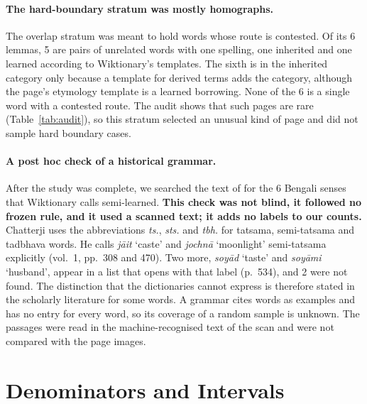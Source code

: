 \documentclass[11pt]{article}
\newcommand{\gl}[1]{`#1'}
\begin{document}
\paragraph{The hard-boundary stratum was mostly homographs.} The overlap stratum was meant to hold words whose route is contested. Of its 6 lemmas, 5 are pairs of unrelated words with one spelling, one inherited and one learned according to Wiktionary's templates. The sixth is in the inherited category only because a template for derived terms adds the category, although the page's etymology template is a learned borrowing. None of the 6 is a single word with a contested route. The audit shows that such pages are rare (Table~\ref{tab:audit}), so this stratum selected an unusual kind of page and did not sample hard boundary cases.

\paragraph{A post hoc check of a historical grammar.} After the study was complete, we searched the text of \citet{chatterji1926} for the 6 Bengali senses that Wiktionary calls semi-learned. \textbf{This check was not blind, it followed no frozen rule, and it used a scanned text; it adds no labels to our counts.} Chatterji uses the abbreviations \textit{ts.}, \textit{sts.} and \textit{tbh.} for tatsama, semi-tatsama and tadbhava words. He calls \textit{j\=ait} \gl{caste} and \textit{jochn\=a} \gl{moonlight} semi-tatsama explicitly (vol.~1, pp.~308 and 470). Two more, \textit{soy\=ad} \gl{taste} and \textit{soy\=ami} \gl{husband}, appear in a list that opens with that label (p.~534), and 2 were not found. The distinction that the dictionaries cannot express is therefore stated in the scholarly literature for some words. A grammar cites words as examples and has no entry for every word, so its coverage of a random sample is unknown. The passages were read in the machine-recognised text of the scan and were not compared with the page images.

\section{Denominators and Intervals}
\label{app:denominators}
\end{document}
